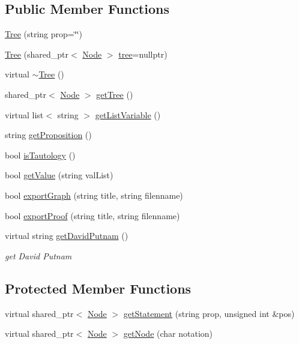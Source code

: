 \subsection*{Public Member Functions}
\begin{DoxyCompactItemize}
\item 
\hyperlink{class_tree_a114a18872bc2535a73ceb0719cde7945}{Tree} (string prop=\char`\"{}\char`\"{})
\item 
\hyperlink{class_tree_a6515b810a36ab46fa79b9dc9d426a8ff}{Tree} (shared\+\_\+ptr$<$ \hyperlink{class_node}{Node} $>$ \hyperlink{class_tree_a9c0875a8767528453814b8e3daf8f9af}{tree}=nullptr)
\item 
virtual \hyperlink{class_tree_abdc38545cf3f588725b5d8b8075b3866}{$\sim$\+Tree} ()
\item 
shared\+\_\+ptr$<$ \hyperlink{class_node}{Node} $>$ \hyperlink{class_tree_ad9bd7cd558397f596703e92fc47aa91f}{get\+Tree} ()
\item 
virtual list$<$ string $>$ \hyperlink{class_tree_a525967d14a17de0ad9c9072b025af1c3}{get\+List\+Variable} ()
\item 
string \hyperlink{class_tree_a7d2c78122409858b2516b52514bd7fe8}{get\+Proposition} ()
\item 
bool \hyperlink{class_tree_a22efa22748fa8d8a598e05ceb327dfd4}{is\+Tautology} ()
\item 
bool \hyperlink{class_tree_abde731a55b92d402fbbd166a577cbe91}{get\+Value} (string val\+List)
\item 
bool \hyperlink{class_tree_ae19f22cfa4b782b5c0a048592ea3e95f}{export\+Graph} (string title, string filenname)
\item 
bool \hyperlink{class_tree_ae235cdb84985c90fa56697a28b0a8d9e}{export\+Proof} (string title, string filenname)
\item 
virtual string \hyperlink{class_tree_a9d7b51cc207222de02ccb59192454de5}{get\+David\+Putnam} ()
\begin{DoxyCompactList}\small\item\em get David Putnam \end{DoxyCompactList}\end{DoxyCompactItemize}
\subsection*{Protected Member Functions}
\begin{DoxyCompactItemize}
\item 
virtual shared\+\_\+ptr$<$ \hyperlink{class_node}{Node} $>$ \hyperlink{class_tree_a016c2300dfa5444a52e6e6db7be850d2}{get\+Statement} (string prop, unsigned int \&pos)
\item 
virtual shared\+\_\+ptr$<$ \hyperlink{class_node}{Node} $>$ \hyperlink{class_tree_a60a9b7d65fc663d2db005b01119efa73}{get\+Node} (char notation)
\end{DoxyCompactItemize}
